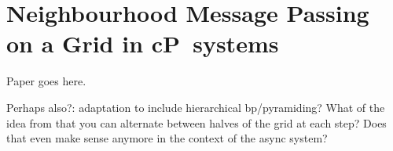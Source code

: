 \chapter{Neighbourhood Message Passing on a Grid in cP~systems}
Paper goes here.

Perhaps also?:  adaptation to include hierarchical \gls{bp}/pyramiding?  What of the idea from \cite{Felzenszwalb2006} that you can alternate between halves of the grid at each step?  Does that even make sense anymore in the context of the async system?